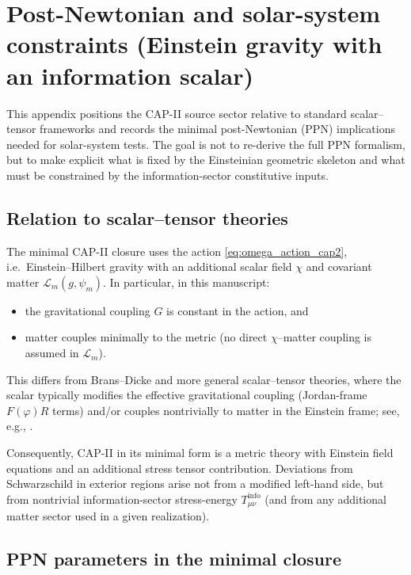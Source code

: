 \section{Post-Newtonian and solar-system constraints (Einstein gravity with an information scalar)}
\label{app:ppn_solar_system}

This appendix positions the CAP-II source sector relative to standard scalar--tensor frameworks and records the minimal post-Newtonian (PPN) implications needed for solar-system tests.
The goal is not to re-derive the full PPN formalism, but to make explicit what is fixed by the Einsteinian geometric skeleton and what must be constrained by the information-sector constitutive inputs.

\subsection{Relation to scalar--tensor theories}
\label{app:ppn_relation_scalar_tensor}

The minimal CAP-II closure uses the action \eqref{eq:omega_action_cap2}, i.e.\ Einstein--Hilbert gravity with an additional scalar field $\chi$ and covariant matter $\mathcal{L}_m(g,\psi_m)$.
In particular, in this manuscript:
\begin{itemize}
  \item the gravitational coupling $G$ is constant in the action, and
  \item matter couples minimally to the metric (no direct $\chi$--matter coupling is assumed in $\mathcal{L}_m$).
\end{itemize}
This differs from Brans--Dicke and more general scalar--tensor theories, where the scalar typically modifies the effective gravitational coupling (Jordan-frame $F(\varphi)R$ terms) and/or couples nontrivially to matter in the Einstein frame; see, e.g., \cite{BransDicke1961,Will1993,Will2014}.
\par
\noindent Consequently, CAP-II in its minimal form is a metric theory with Einstein field equations and an additional stress tensor contribution.
Deviations from Schwarzschild in exterior regions arise not from a modified left-hand side, but from nontrivial information-sector stress-energy $T^{\mathrm{info}}_{\mu\nu}$ (and from any additional matter sector used in a given realization).

\subsection{PPN parameters in the minimal closure}
\label{app:ppn_parameters}


